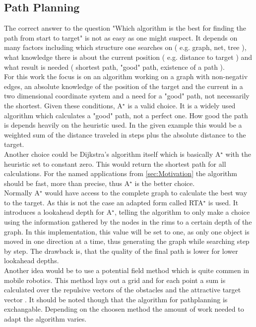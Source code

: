 \subsection{Path Planning}
The correct answer to the question "Which algorithm is the best for finding the path from start to target" is not as easy as one might suspect. 
It depends on many factors including which structure one searches on ( e.g. graph, net, tree ), what knowledge there is about the current position ( e.g. distance to target ) and what result is needed ( shortest path, "good" path, existence of a path ).\\
For this work the focus is on an algorithm working on a graph with non-negativ edges, an absolute knowledge of the position of the target and the current in a two dimensional coordinate system and a need for a "good" path, not necessarily the shortest. Given these conditions, A$^\star$ \cite{ComputerScience} is a valid choice. It is a widely used algorithm which calculates a "good" path, not a perfect one. How good the path is depends heavily on the heuristic used. In the given example this would be a weighted sum of the distance traveled in steps plus the absolute distance to the target.\\
Another choice could be Dijkstra's algorithm \cite{ComputerScience} itself which is basically A$^\star$ with the heuristic set to constant zero. This would return the shortest path for all calculations. For the named applications from \ref{sec:Motivation} the algorithm should be fast, more than precise, thus A$^\star$ is the better choice.\\
Normally A$^\star$ would have access to the complete graph to calculate the best way to the target. As this is not the case an adapted form called RTA$^\star$ \cite{rta} is used. It introduces a lookahead depth for A$^\star$, telling the algorithm to only make a choice using the information gathered by the nodes in the rims to a certain depth of the graph. In this implementation, this value will be set to one, as only one object is moved in one direction at a time, thus generating the graph while searching step by step. The drawback is, that the quality of the final path is lower for lower lookahead depths.\\
Another idea would be to use a potential field method which is quite commen in mobile robotics. This method lays out a grid and for each point a sum is calculated over the repulsive vectors of the obstacles and the attractive target vector \cite{hwang1992potential}. 
It should be noted though that the algorithm for pathplanning is exchangable. Depending on the choosen method the amount of work needed to adapt the algorithm varies.


